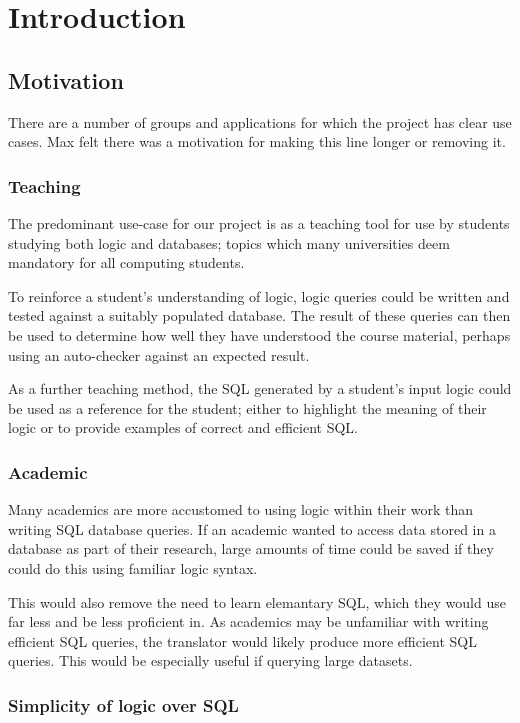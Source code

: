 \documentclass[a4paper, 11pt]{article}
\begin{document}
\section{Introduction}
  \subsection{Motivation}
    There are a number of groups and applications for which the project has
    clear use cases. Max felt there was a motivation for making this line longer
    or removing it.

    \subsubsection{Teaching}
      The predominant use-case for our project is as a teaching tool for use by
      students studying both logic and databases; topics which many universities
      deem mandatory for all computing students.
    
      To reinforce a student's understanding of logic, logic queries could be
      written and tested against a suitably populated database. The result of
      these queries can then be used to determine how well they have understood
      the course material, perhaps using an auto-checker against an expected
      result.

      As a further teaching method, the SQL generated by a student's input logic
      could be used as a reference for the student; either to highlight the
      meaning of their logic or to provide examples of correct and efficient
      SQL.     

    \subsubsection{Academic}
      Many academics are more accustomed to using logic within their work than
      writing SQL database queries. If an academic wanted to access data stored
      in a database as part of their research, large amounts of time could be
      saved if they could do this using familiar logic syntax.

      This would also remove the need to learn elemantary SQL, which they would
      use far less and be less proficient in. As academics may be unfamiliar
      with writing efficient SQL queries, the translator would likely produce
      more efficient SQL queries. This would be especially useful if querying
      large datasets.

    \subsubsection{Simplicity of logic over SQL}
\end{document}
